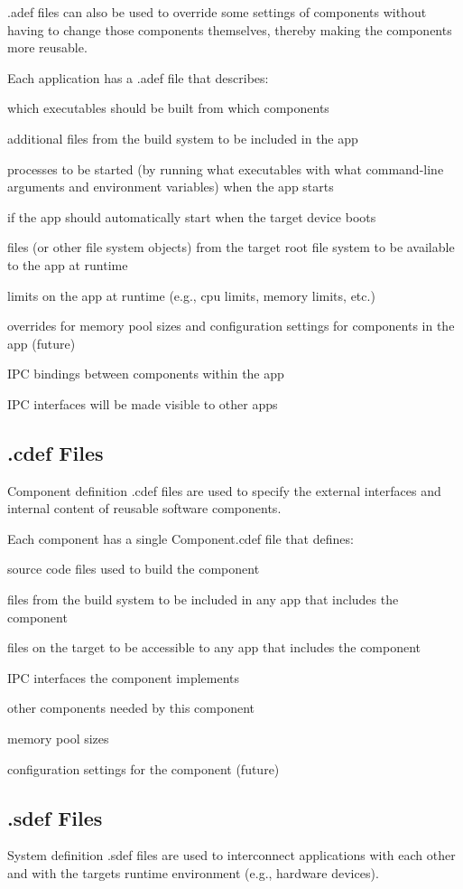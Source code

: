 {\ttfamily .adef} files can also be used to override some settings of components without having to change those components themselves, thereby making the components more reusable.

Each application has a {\ttfamily .adef} file that describes\+:
\begin{DoxyItemize}
\item which executables should be built from which components
\item additional files from the build system to be included in the app
\item processes to be started (by running what executables with what command-\/line arguments and environment variables) when the app starts
\item if the app should automatically start when the target device boots
\item files (or other file system objects) from the target root file system to be available to the app at runtime
\item limits on the app at runtime (e.\+g., cpu limits, memory limits, etc.)
\item overrides for memory pool sizes and configuration settings for components in the app (future)
\item I\+P\+C bindings between components within the app
\item I\+P\+C interfaces will be made visible to other apps
\end{DoxyItemize}\hypertarget{def_files_overview_defFilesOverview_cdef}{}\subsection{.\+cdef Files}\label{def_files_overview_defFilesOverview_cdef}
Component definition {\ttfamily }.cdef files are used to specify the external interfaces and internal content of reusable software components.

Each component has a single {\ttfamily Component.\+cdef} file that defines\+:
\begin{DoxyItemize}
\item source code files used to build the component
\item files from the build system to be included in any app that includes the component
\item files on the target to be accessible to any app that includes the component
\item I\+P\+C interfaces the component implements
\item other components needed by this component
\item memory pool sizes
\item configuration settings for the component (future)
\end{DoxyItemize}\hypertarget{def_files_overview_defFilesOverview_sdef}{}\subsection{.\+sdef Files}\label{def_files_overview_defFilesOverview_sdef}
System definition {\ttfamily }.sdef files are used to interconnect applications with each other and with the target\textquotesingle{}s runtime environment (e.\+g., hardware devices).

